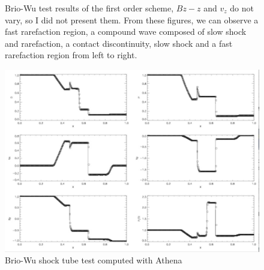 \documentclass[11pt, oneside]{article}   	%
\begin{document}
\begin{figure}[H]

\caption{Brio-Wu test results of the first order scheme, $Bz-z$ and $v_z$ do not vary, so I did not present them. From these figures, we can observe a fast rarefaction region, a compound wave composed of slow shock and rarefaction, a contact discontinuity, slow shock and a fast rarefaction region from left to right.}

\end{figure}

\begin{figure}[H]
\centering
\includegraphics[scale = 0.3]{brio_athena.png}
\caption{Brio-Wu shock tube test computed with Athena}
\end{figure}
\end{document}
